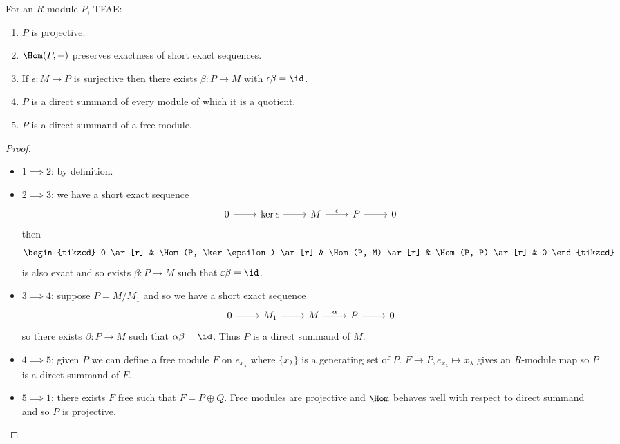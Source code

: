 \documentclass[a4paper]{article}
\begin{document}
\begin{lemma}
  For an \(R\)-module \(P\), TFAE:
  \begin{enumerate}
  \item \(P\) is projective.
  \item \(\Hom(P, -)\) preserves exactness of short exact sequences.
  \item If \(\epsilon: M \to P\) is surjective then there exists \(\beta: P \to M\) with \(\epsilon \beta = \id\).
  \item \(P\) is a direct summand of every module of which it is a quotient.
  \item \(P\) is a direct summand of a free module.
  \end{enumerate}
\end{lemma}

\begin{proof}\leavevmode
  \begin{itemize}
  \item \(1 \implies 2\): by definition.
  \item \(2 \implies 3\): we have a short exact sequence
    \[
      \begin{tikzcd}
        0 \ar[r] & \ker \epsilon \ar[r] & M \ar[r, "\epsilon"] & P \ar[r] & 0
      \end{tikzcd}
    \]
    then
    \[
      \begin{tikzcd}
        0 \ar[r] & \Hom(P, \ker \epsilon) \ar[r] & \Hom(P, M) \ar[r] & \Hom(P, P) \ar[r] & 0
      \end{tikzcd}
    \]
    is also exact and so exists \(\beta: P \to M\) such that \(\varepsilon \beta = \id\).
  \item \(3 \implies 4\): suppose \(P = M/M_1\) and so we have a short exact sequence
    \[
      \begin{tikzcd}
        0 \ar[r] & M_1 \ar[r] & M \ar[r, "\alpha"] & P \ar[r] & 0
      \end{tikzcd}
    \]
    so there exists \(\beta: P \to M\) such that \(\alpha \beta = \id\). Thus \(P\) is a direct summand of \(M\).
  \item \(4 \implies 5\): given \(P\) we can define a free module \(F\) on \(e_{x_\lambda}\) where \(\{x_\lambda\}\) is a generating set of \(P\). \(F \to P, e_{x_\lambda} \mapsto x_\lambda\) gives an \(R\)-module map so \(P\) is a direct summand of \(F\).
  \item \(5 \implies 1\): there exists \(F\) free such that \(F = P \oplus Q\). Free modules are projective and \(\Hom\) behaves well with respect to direct summand and so \(P\) is projective.
  \end{itemize}
\end{proof}
\end{document}

